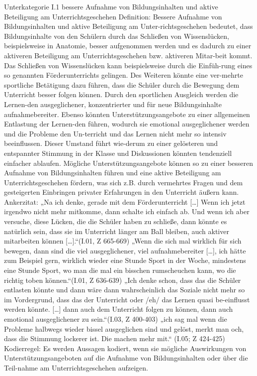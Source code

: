 Unterkategorie I.1 bessere Aufnahme von Bildungsinhalten und aktive Beteiligung am Unterrichtsgeschehen
Definition: Bessere Aufnahme von Bildungsinhalten und aktive Beteiligung am Unter-richtsgeschehen bedeutet, dass Bildungsinhalte von den Schülern durch das Schließen von Wissenslücken, beispielsweise in Anatomie, besser aufgenommen werden und es dadurch zu einer aktiveren Beteiligung am Unterrichtsgeschehen bzw. aktiveren Mitar-beit kommt. Das Schließen von Wissenslücken kann beispielsweise durch die Einfüh-rung eines so genannten Förderunterrichts gelingen. Des Weiteren könnte eine ver-mehrte sportliche Betätigung dazu führen, dass die Schüler durch die Bewegung dem Unterricht besser folgen können. Durch den sportlichen Ausgleich werden die Lernen-den ausgeglichener, konzentrierter und für neue Bildungsinhalte aufnahmebereiter. Ebenso könnten Unterstützungsangebote zu einer allgemeinen Entlastung der Lernen-den führen, wodurch sie emotional ausgeglichener werden und die Probleme den Un-terricht und das Lernen nicht mehr so intensiv beeinflussen. Dieser Umstand führt wie-derum zu einer gelösteren und entspannter Stimmung in der Klasse und Diskussionen könnten tendenziell einfacher ablaufen. Mögliche Unterstützungsangebote können so zu einer besseren Aufnahme von Bildungsinhalten führen und eine aktive Beteiligung am Unterrichtsgeschehen fördern, was sich z.B. durch vermehrtes Fragen und dem gesteigerten Einbringen privater Erfahrungen in den Unterricht äußern kann.
Ankerzitat: „Na ich denke, gerade mit dem Förderunterricht […] Wenn ich jetzt irgendwo nicht mehr mitkomme, dann schalte ich einfach ab. Und wenn ich aber versuche, diese Lücken, die die Schüler haben zu schließe, dann könnte es natürlich sein, dass sie im Unterricht länger am Ball bleiben, auch aktiver mitarbeiten können […].“(I.01, Z 665-669) „Wenn die sich mal wirklich für sich bewegen, dann sind die viel ausgeglichener, viel aufnahmebereiter […], ich hätte zum Beispiel gern, wirklich wieder eine Stunde Sport in der Woche, mindestens eine Stunde Sport, wo man die mal ein bisschen rumscheuchen kann, wo die richtig toben können.“(I.01, Z 636-639) „Ich denke schon, dass das die Schüler entlasten könnte und dann wäre dann wahrscheinlich das Soziale nicht mehr so im Vordergrund, dass das der Unterricht oder /eh/ das Lernen quasi be-einflusst werden könnte. […] dann auch dem Unterricht folgen zu können, dann auch emotional ausgeglichener zu sein.“(I.03, Z 400-403)
„ich sag mal wenn die Probleme halbwegs wieder bissel ausgeglichen sind und gelöst, merkt man och, dass die Stimmung lockerer ist. Die machen mehr mit.“ (I.05; Z 424-425)
Kodierregel: Es werden Aussagen kodiert, wenn sie mögliche Auswirkungen von Unterstützungsangeboten auf die Aufnahme von Bildungsinhalten oder über die Teil-nahme am Unterrichtsgeschehen aufzeigen. 

